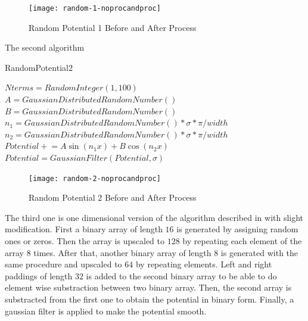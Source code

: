\documentclass[a4paper,times,hidelinks,12pt]{article}
\begin{document}
\graphicspath{{"../figs/potentials/"}}
\begin{figure}[H]
    \centering
        \texttt{[image: random-1-noprocandproc]}
\caption{Random Potential 1 Before and After Process}
\label{fig:random1_before_after}
\end{figure}

The second algorithm  


\begin{algorithm}[H]
    \caption{RandomPotential2}\label{euclid}
    \begin{algorithmic}[1]
        \State $ Nterms = RandomInteger(1, 100)$
        \State $A = GaussianDistributedRandomNumber()$
        \State $B = GaussianDistributedRandomNumber()$
        \State $n_1 = GaussianDistributedRandomNumber() * \sigma*\pi / width  $
        \State $n_2 = GaussianDistributedRandomNumber() * \sigma*\pi / width  $
        \State $Potential \mathrel{+}= A\sin(n_1 x) + B\cos(n_2 x)$
        \EndFor
        \State $Potential = GaussianFilter(Potential, \sigma)$ 
    \EndProcedure
    \end{algorithmic}
\label{alg:random_potential_1}
\end{algorithm}

\graphicspath{{"../figs/potentials/"}}
\begin{figure}[H]
    \centering
        \texttt{[image: random-2-noprocandproc]}
\caption{Random Potential 2 Before and After Process}
\label{fig:random2_before_after}
\end{figure}

The third one is one dimensional version of the algorithm described in \cite{mills2017deep} with slight modification. First a binary array of length $16$ is generated by assigning random ones or zeros. Then the array is upscaled to $128$ by repeating each element of the array $8$ times. After that, another binary array of length $8$ is generated with the same procedure and upscaled to $64$ by repeating elements. Left and right paddings of length $32$ is added to the second binary array to be able to do element wise substraction between two binary array. Then, the second array is substracted from the first one to obtain the potential in binary form. Finally, a gaussian filter is applied to make the potential smooth. 
\end{document}

